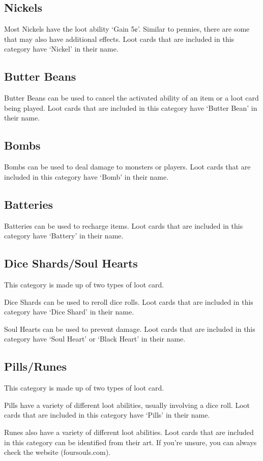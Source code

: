 \documentclass[
  fontsize=10pt,
  paper=a5,
  version=last,
  chapterprefix=true,
  bindingoffset=5mm,
  ]{scrbook}
\begin{document}
    \subsection*{Nickels}
    Most Nickels have the loot ability ‘Gain 5¢’. Similar to pennies, there are some that may also have additional effects. Loot cards that are included in this category have ‘Nickel’ in their name.
    \subsection*{Butter Beans}
    Butter Beans can be used to cancel the activated ability of an item or a loot card being played. Loot cards that are included in this category have ‘Butter Bean’ in their name.
    \subsection*{Bombs}
    Bombs can be used to deal damage to monsters or players. Loot cards that are included in this category have ‘Bomb’ in their name.
    \subsection*{Batteries}
    Batteries can be used to recharge items. Loot cards that are included in this category have ‘Battery’ in their name.
    \subsection*{Dice Shards/Soul Hearts}
    This category is made up of two types of loot card.
    
    Dice Shards can be used to reroll dice rolls. Loot cards that are included in this category have ‘Dice Shard’ in their name.
    
    Soul Hearts can be used to prevent damage. Loot cards that are included in this category have ‘Soul Heart’ or ‘Black Heart’ in their name.
    \subsection*{Pills/Runes}
    This category is made up of two types of loot card.
    
    Pills have a variety of different loot abilities, usually involving a dice roll. Loot cards that are included in this category have ‘Pills’ in their name.
    
    Runes also have a variety of different loot abilities. Loot cards that are included in this category can be identified from their art. If you’re unsure, you can always check the website (foursouls.com).
\end{document}
